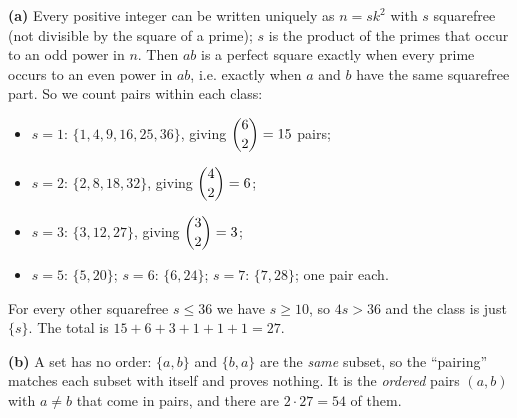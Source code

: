 \textbf{(a)} Every positive integer can be written uniquely as $n=sk^2$ with $s$ squarefree (not divisible by the square of a prime); $s$ is the product of the primes that occur to an odd power in $n$. Then $ab$ is a perfect square exactly when every prime occurs to an even power in $ab$, i.e. exactly when $a$ and $b$ have the same squarefree part. So we count pairs within each class:
\begin{itemize}
\item $s=1$: $\{1,4,9,16,25,36\}$, giving $\dbinom62=15$ pairs;
\item $s=2$: $\{2,8,18,32\}$, giving $\dbinom42=6$;
\item $s=3$: $\{3,12,27\}$, giving $\dbinom32=3$;
\item $s=5$: $\{5,20\}$; $s=6$: $\{6,24\}$; $s=7$: $\{7,28\}$; one pair each.
\end{itemize}
For every other squarefree $s\le36$ we have $s\ge10$, so $4s>36$ and the class is just $\{s\}$. The total is $15+6+3+1+1+1=\boxed{27}$.

\textbf{(b)} A set has no order: $\{a,b\}$ and $\{b,a\}$ are the \emph{same} subset, so the ``pairing'' matches each subset with itself and proves nothing. It is the \emph{ordered} pairs $(a,b)$ with $a\ne b$ that come in pairs, and there are $2\cdot27=54$ of them.
